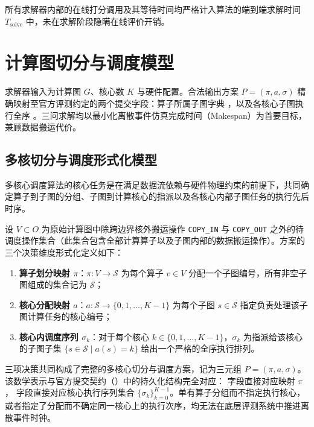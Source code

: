 \documentclass[anonymous,withtoc]{gmcm2026}
\providecommand{\tightlist}{\setlength{\itemsep}{0pt}\setlength{\parskip}{0pt}}
\begin{document}
所有求解器内部的在线打分调用及其等待时间均严格计入算法的端到端求解时间 \(T_{\text{solve}}\) 中，未在求解阶段隐瞒在线评价开销。


\section{计算图切分与调度模型}

求解器输入为计算图 \(G\)、核心数 \(K\) 与硬件配置。合法输出方案 \(P = (\pi, a, \sigma)\) 精确映射至官方评测约定的两个提交字段：算子所属子图字典 \texttt{}，以及各核心子图执行全序 \texttt{}。三问求解均以最小化离散事件仿真完成时间（Makespan）为首要目标，兼顾数据搬运代价。

\subsection{多核切分与调度形式化模型}

多核心调度算法的核心任务是在满足数据流依赖与硬件物理约束的前提下，共同确定算子到子图的分组、子图到计算核心的指派以及各核心内部子图任务的执行先后时序。

设 \(V \subset O\) 为原始计算图中除跨边界核外搬运操作 \texttt{COPY\_IN} 与 \texttt{COPY\_OUT} 之外的待调度操作集合（此集合包含全部计算算子以及子图内部的数据搬运操作）。方案的三个决策维度形式化定义如下：

\begin{enumerate}
\def\labelenumi{\arabic{enumi}.}
\tightlist
\item
  \textbf{算子划分映射 \(\pi\)}：\(\pi: V \to \mathcal{S}\) 为每个算子 \(v \in V\) 分配一个子图编号，所有非空子图组成的集合记为 \(\mathcal{S}\)；
\item
  \textbf{核心分配映射 \(a\)}：\(a: \mathcal{S} \to \{0, 1, \dots, K-1\}\) 为每个子图 \(s \in \mathcal{S}\) 指定负责处理该子图计算任务的核心编号；
\item
  \textbf{核心内调度序列 \(\sigma_k\)}：对于每个核心 \(k \in \{0, 1, \dots, K-1\}\)，\(\sigma_k\) 为指派给该核心的子图子集 \(\{s \in \mathcal{S} \mid a(s) = k\}\) 给出一个严格的全序执行排列。
\end{enumerate}

三项决策共同构成了完整的多核心切分与调度方案，记为三元组 \(P = (\pi, a, \sigma)\)。该数学表示与官方提交契约（\texttt{}）中的持久化结构完全对应：\texttt{} 字段直接对应映射 \(\pi\)，\texttt{} 字段直接对应核心执行序列集合 \(\{\sigma_k\}_{k=0}^{K-1}\)。单有算子分组而不指定执行核心，或者指定了分配而不确定同一核心上的执行次序，均无法在底层评测系统中推进离散事件时钟。
\end{document}
